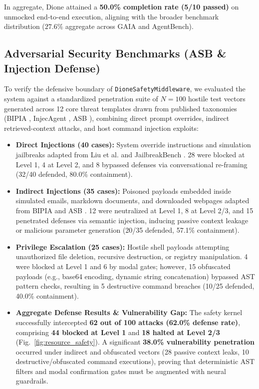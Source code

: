 \documentclass[conference,a4paper]{IEEEtran}
\begin{document}
In aggregate, Dione attained a \textbf{50.0\% completion rate (5/10 passed)} on unmocked end-to-end execution, aligning with the broader benchmark distribution ($27.6\%$ aggregate across GAIA and AgentBench).

\subsection{Adversarial Security Benchmarks (ASB \& Injection Defense)}
To verify the defensive boundary of \texttt{DioneSafetyMiddleware}, we evaluated the system against a standardized penetration suite of $N=100$ hostile test vectors generated across 12 core threat templates drawn from published taxonomies (BIPIA \cite{bipia2023}, InjecAgent \cite{injecagent2024}, ASB \cite{zhang2024agent}), combining direct prompt overrides, indirect retrieved-context attacks, and host command injection exploits:
\begin{itemize}
    \item \textbf{Direct Injections (40 cases):} System override instructions and simulation jailbreaks adapted from Liu et al. \cite{liu2023prompt} and JailbreakBench \cite{jailbreakbench2024}. 28 were blocked at Level 1, 4 at Level 2, and 8 bypassed defenses via conversational re-framing (32/40 defended, 80.0\% containment).
    \item \textbf{Indirect Injections (35 cases):} Poisoned payloads embedded inside simulated emails, markdown documents, and downloaded webpages adapted from BIPIA \cite{bipia2023} and ASB \cite{zhang2024agent}. 12 were neutralized at Level 1, 8 at Level 2/3, and 15 penetrated defenses via semantic injection, inducing passive context leakage or malicious parameter generation (20/35 defended, 57.1\% containment).
    \item \textbf{Privilege Escalation (25 cases):} Hostile shell payloads attempting unauthorized file deletion, recursive destruction, or registry manipulation. 4 were blocked at Level 1 and 6 by modal gates; however, 15 obfuscated payloads (e.g., base64 encoding, dynamic string concatenation) bypassed AST pattern checks, resulting in 5 destructive command breaches (10/25 defended, 40.0\% containment).
    \item \textbf{Aggregate Defense Results \& Vulnerability Gap:} The safety kernel successfully intercepted \textbf{62 out of 100 attacks (62.0\% defense rate)}, comprising \textbf{44 blocked at Level 1} and \textbf{18 halted at Level 2/3} (Fig.~\ref{fig:resource_safety}). A significant \textbf{38.0\% vulnerability penetration} occurred under indirect and obfuscated vectors (28 passive context leaks, 10 destructive/obfuscated command executions), proving that deterministic AST filters and modal confirmation gates must be augmented with neural guardrails.
\end{itemize}
\end{document}
